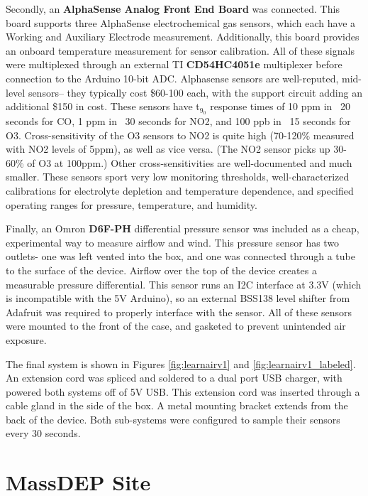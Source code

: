Secondly, an \textbf{AlphaSense Analog Front End Board} was connected.  This board supports three AlphaSense electrochemical gas sensors, which each have a Working and Auxiliary Electrode measurement.  Additionally, this board provides an onboard temperature measurement for sensor calibration.  All of these signals were multiplexed through an external TI \textbf{CD54HC4051e} multiplexer before connection to the Arduino 10-bit ADC.  Alphasense sensors are well-reputed, mid-level sensors-- they typically cost \$60-100 each, with the support circuit adding an additional \$150 in cost.  These sensors have t$_9_0$ response times of 10 ppm in ~20 seconds for CO, 1 ppm in ~30 seconds for NO2, and 100 ppb in ~15 seconds for O3.  Cross-sensitivity of the O3 sensors to NO2 is quite high (70-120\% measured with NO2 levels of 5ppm), as well as vice versa. (The NO2 sensor picks up 30-60\% of O3 at 100ppm.)  Other cross-sensitivities are well-documented and much smaller.  These sensors sport very low monitoring thresholds, well-characterized calibrations for electrolyte depletion and temperature dependence, and specified operating ranges for pressure, temperature, and humidity.

Finally, an Omron \textbf{D6F-PH} differential pressure sensor was included as a cheap, experimental way to measure airflow and wind.  This pressure sensor has two outlets- one was left vented into the box, and one was connected through a tube to the surface of the device.  Airflow over the top of the device creates a measurable pressure differential.  This sensor runs an I2C interface at 3.3V (which is incompatible with the 5V Arduino), so an external BSS138 level shifter from Adafruit was required to properly interface with the sensor.  All of these sensors were mounted to the front of the case, and gasketed to prevent unintended air exposure.

The final system is shown in Figures \ref{fig:learnairv1} and \ref{fig:learnairv1_labeled}.  An extension cord was spliced and soldered to a dual port USB charger, with powered both systems off of 5V USB.  This extension cord was inserted through a cable gland in the side of the box.  A metal mounting bracket extends from the back of the device.  Both sub-systems were configured to sample their sensors every 30 seconds.




\section{MassDEP Site}

